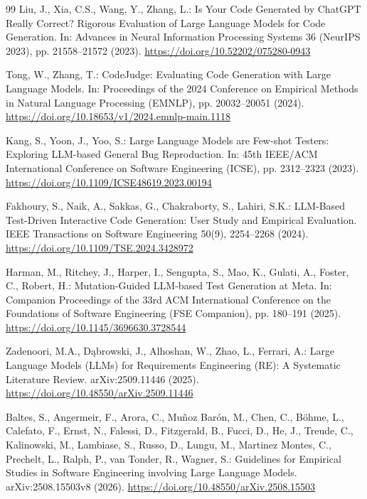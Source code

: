 \begin{thebibliography}{99}
Liu, J., Xia, C.S., Wang, Y., Zhang, L.: Is Your Code Generated by ChatGPT Really Correct? Rigorous Evaluation of Large Language Models for Code Generation. In: Advances in Neural Information Processing Systems 36 (NeurIPS 2023), pp. 21558--21572 (2023). \url{https://doi.org/10.52202/075280-0943}

Tong, W., Zhang, T.: CodeJudge: Evaluating Code Generation with Large Language Models. In: Proceedings of the 2024 Conference on Empirical Methods in Natural Language Processing (EMNLP), pp. 20032--20051 (2024). \url{https://doi.org/10.18653/v1/2024.emnlp-main.1118}

Kang, S., Yoon, J., Yoo, S.: Large Language Models are Few-shot Testers: Exploring LLM-based General Bug Reproduction. In: 45th IEEE/ACM International Conference on Software Engineering (ICSE), pp. 2312--2323 (2023). \url{https://doi.org/10.1109/ICSE48619.2023.00194}

Fakhoury, S., Naik, A., Sakkas, G., Chakraborty, S., Lahiri, S.K.: LLM-Based Test-Driven Interactive Code Generation: User Study and Empirical Evaluation. IEEE Transactions on Software Engineering 50(9), 2254--2268 (2024). \url{https://doi.org/10.1109/TSE.2024.3428972}

Harman, M., Ritchey, J., Harper, I., Sengupta, S., Mao, K., Gulati, A., Foster, C., Robert, H.: Mutation-Guided LLM-based Test Generation at Meta. In: Companion Proceedings of the 33rd ACM International Conference on the Foundations of Software Engineering (FSE Companion), pp. 180--191 (2025). \url{https://doi.org/10.1145/3696630.3728544}

Zadenoori, M.A., D\k{a}browski, J., Alhoshan, W., Zhao, L., Ferrari, A.: Large Language Models (LLMs) for Requirements Engineering (RE): A Systematic Literature Review. arXiv:2509.11446 (2025). \url{https://doi.org/10.48550/arXiv.2509.11446}

Baltes, S., Angermeir, F., Arora, C., Mu\~{n}oz Bar\'{o}n, M., Chen, C., B\"{o}hme, L., Calefato, F., Ernst, N., Falessi, D., Fitzgerald, B., Fucci, D., He, J., Treude, C., Kalinowski, M., Lambiase, S., Russo, D., Lungu, M., Martinez Montes, C., Prechelt, L., Ralph, P., van Tonder, R., Wagner, S.: Guidelines for Empirical Studies in Software Engineering involving Large Language Models. arXiv:2508.15503v8 (2026). \url{https://doi.org/10.48550/arXiv.2508.15503}


\end{thebibliography}
